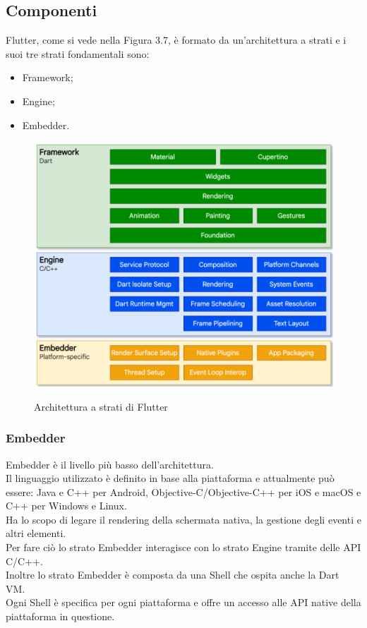 \subsection{Componenti}
Flutter, come si vede nella Figura 3.7, è formato da un'architettura a strati \cite{flutterd, flutterdettagli} e i suoi tre strati fondamentali sono:
\begin{itemize}
	\item Framework; 
	\item Engine;  
	\item Embedder.\\
\end{itemize}
\begin{figure}[htbp]	
	\centering
	\includegraphics[width=13cm]{immagini/composizione.png}
	\caption{Architettura a strati di Flutter}
	\label{fig:Architettura a strati di Flutter}
	\cite{flutterdettagli}
\end{figure}

\newpage

\subsubsection{Embedder}
Embedder è il livello più basso dell'architettura.\\
Il linguaggio utilizzato è definito in base alla piattaforma e attualmente può essere: Java e C++ per Android, Objective-C/Objective-C++ per iOS e macOS e C++ per Windows e Linux.\\
Ha lo scopo di legare il rendering della schermata nativa, la gestione degli eventi e altri elementi.\\
Per fare ciò lo strato Embedder interagisce con lo strato Engine tramite delle API C/C++.\\
Inoltre lo strato Embedder è composta da una Shell che ospita anche la Dart VM.		\\
Ogni Shell è specifica per ogni piattaforma e offre un accesso alle API native della piattaforma in questione.


